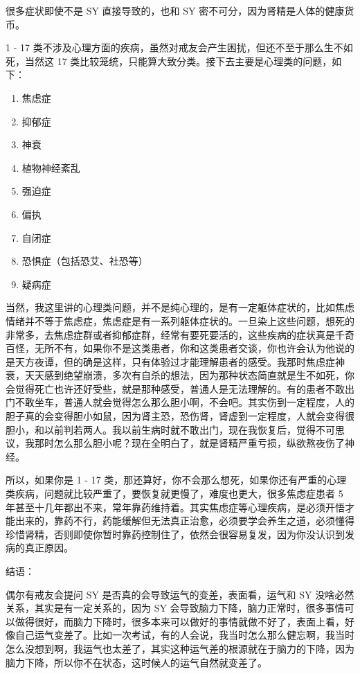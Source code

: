 \documentclass{ctexart}
\begin{document}
很多症状即使不是 SY 直接导致的，也和 SY 密不可分，因为肾精是人体的健康货币。

1 - 17 类不涉及心理方面的疾病，虽然对戒友会产生困扰，但还不至于那么生不如死，当然这 17 类比较笼统，只能算大致分类。接下去主要是心理类的问题，如下：

\begin{enumerate}
    \item 焦虑症
    \item 抑郁症
    \item 神衰
    \item 植物神经紊乱
    \item 强迫症
    \item 偏执
    \item 自闭症
    \item 恐惧症（包括恐艾、社恐等）
    \item 疑病症
\end{enumerate}

当然，我这里讲的心理类问题，并不是纯心理的，是有一定躯体症状的，比如焦虑情绪并不等于焦虑症，焦虑症是有一系列躯体症状的。一旦染上这些问题，想死的非常多，去焦虑症群或者抑郁症群，经常有要死要活的，这些疾病的症状真是千奇百怪，无所不有，如果你不是这类患者，你和这类患者交谈，你也许会认为他说的是天方夜谭，但的确是这样，只有体验过才能理解患者的感受。我那时焦虑症神衰，天天感到绝望崩溃，多次有自杀的想法，因为那种状态简直就是生不如死，你会觉得死亡也许还好受些，就是那种感受，普通人是无法理解的。有的患者不敢出门不敢坐车，普通人就会觉得怎么那么胆小啊，不会吧。其实伤到一定程度，人的胆子真的会变得胆小如鼠，因为肾主恐，恐伤肾，肾虚到一定程度，人就会变得很胆小，和以前判若两人。我以前生病时就不敢出门，现在我恢复后，觉得不可思议，我那时怎么那么胆小呢？现在全明白了，就是肾精严重亏损，纵欲熬夜伤了神经。

所以，如果你是 1 - 17 类，那还算好，你不会那么想死，如果你还有严重的心理类疾病，问题就比较严重了，要恢复就更慢了，难度也更大，很多焦虑症患者 5 年甚至十几年都出不来，常年靠药维持着。其实焦虑症等心理疾病，是必须开悟才能出来的，靠药不行，药能缓解但无法真正治愈，必须要学会养生之道，必须懂得珍惜肾精，否则即使你暂时靠药控制住了，依然会很容易复发，因为你没认识到发病的真正原因。

结语：

偶尔有戒友会提问 SY 是否真的会导致运气的变差，表面看，运气和 SY 没啥必然关系，其实是有一定关系的，因为 SY 会导致脑力下降，脑力正常时，很多事情可以做得很好，而脑力下降时，很多本来可以做好的事情就做不好了，表面上看，好像自己运气变差了。比如一次考试，有的人会说，我当时怎么那么健忘啊，我当时怎么没想到啊，我运气也太差了，其实这种运气差的根源就在于脑力的下降，因为脑力下降，所以你不在状态，这时候人的运气自然就变差了。
\end{document}

